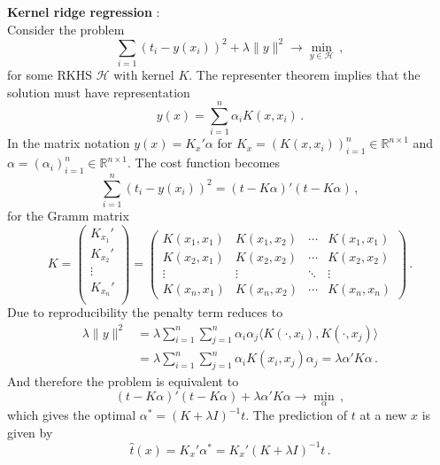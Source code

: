 \documentclass[a4paper]{article}
\newcommand{\Real}{\mathbb{R}}
\newcommand{\Hcal}{\mathcal{H}}
\begin{document}
\noindent\textbf{Kernel ridge regression} : \hfill\\
Consider the problem
\[ \sum_{i=1} (t_i - y(x_i))^2 + \lambda \|y\|^2 \to \min_{y\in \Hcal}\,,\]
for some RKHS $\Hcal$ with kernel $K$. The representer theorem implies that the
solution must have representation
\[ y(x) = \sum_{i=1}^n \alpha_i K(x, x_i)\,. \]
In the matrix notation $y(x) = K_x' \alpha$ for $K_x = (K(x,x_i))_{i=1}^n \in \Real^{n\times 1}$
and $\alpha = (\alpha_i)_{i=1}^n \in \Real^{n\times 1}$. The cost function
becomes	
\[
\sum_{i=1}^n (t_i - y(x_i))^2 = (t-K\alpha)'(t-K\alpha)\,,
\]
for the Gramm matrix
\[
K = \begin{pmatrix} K_{x_1}'\\ K_{x_2}'\\ \vdots\\ K_{x_n}'\\ \end{pmatrix}
 = \begin{pmatrix}
		K(x_1,x_1) & K(x_1,x_2) & \cdots & K(x_1,x_1) \\
		K(x_2,x_1) & K(x_2,x_2) & \cdots & K(x_2,x_2) \\
		\vdots & \vdots & \ddots & \vdots \\
		K(x_n,x_1) & K(x_n,x_2) & \cdots & K(x_n,x_n)
	\end{pmatrix}\,.
\]
Due to reproducibility the penalty term reduces to
\begin{align*}
	\lambda \|y\|^2
	&= \lambda \sum_{i=1}^n \sum_{j=1}^n \alpha_i \alpha_j \langle K(\cdot,x_i), K(\cdot,x_j)\rangle\\
	&= \lambda \sum_{i=1}^n \sum_{j=1}^n \alpha_i K(x_i,x_j) \alpha_j
	= \lambda \alpha' K \alpha\,.
\end{align*}
And therefore the problem is equivalent to
\[ (t-K\alpha)'(t-K\alpha) + \lambda \alpha' K \alpha \to \min_\alpha\,,\]
which gives the optimal $\alpha^* = (K+\lambda I)^{-1} t$. The prediction of $t$
at a new $x$ is given by
\[ \hat{t}(x) = K_x'\alpha^* = K_x' (K+\lambda I)^{-1} t \,. \]

\end{document}
